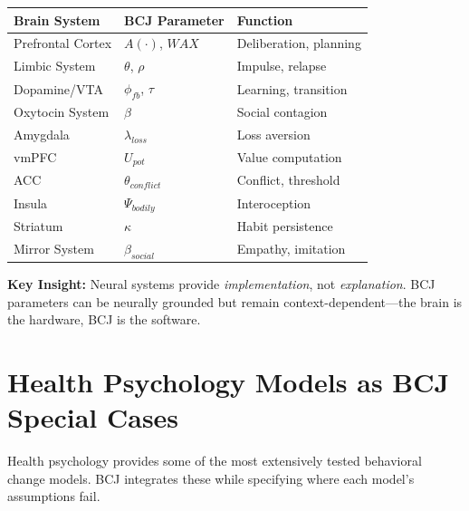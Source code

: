 \begin{tcolorbox}[colback=cyan!5!white, colframe=cyan!75!black,
    title=Neural-BCJ Parameter Mapping]
\begin{center}
\begin{tabular}{lll}
\toprule
\textbf{Brain System} & \textbf{BCJ Parameter} & \textbf{Function} \\
\midrule
Prefrontal Cortex & $A(\cdot)$, $WAX$ & Deliberation, planning \\
Limbic System & $\theta$, $\rho$ & Impulse, relapse \\
Dopamine/VTA & $\phi_{fb}$, $\tau$ & Learning, transition \\
Oxytocin System & $\beta$ & Social contagion \\
Amygdala & $\lambda_{loss}$ & Loss aversion \\
vmPFC & $U_{pot}$ & Value computation \\
ACC & $\theta_{conflict}$ & Conflict, threshold \\
Insula & $\Psi_{bodily}$ & Interoception \\
Striatum & $\kappa$ & Habit persistence \\
Mirror System & $\beta_{social}$ & Empathy, imitation \\
\bottomrule
\end{tabular}
\end{center}

\textbf{Key Insight:} Neural systems provide \textit{implementation}, not \textit{explanation}. BCJ parameters can be neurally grounded but remain context-dependent---the brain is the hardware, BCJ is the software.
\end{tcolorbox}



\section{Health Psychology Models as BCJ Special Cases}
\label{sec:health-psychology}

Health psychology provides some of the most extensively tested behavioral change models. BCJ integrates these while specifying where each model's assumptions fail.


